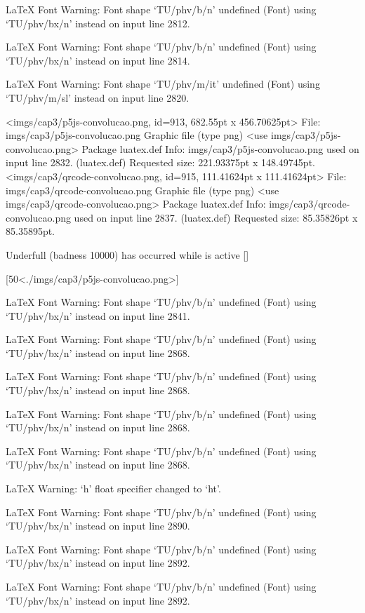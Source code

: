 LaTeX Font Warning: Font shape `TU/phv/b/n' undefined
(Font)              using `TU/phv/bx/n' instead on input line 2812.


LaTeX Font Warning: Font shape `TU/phv/b/n' undefined
(Font)              using `TU/phv/bx/n' instead on input line 2814.


LaTeX Font Warning: Font shape `TU/phv/m/it' undefined
(Font)              using `TU/phv/m/sl' instead on input line 2820.

<imgs/cap3/p5js-convolucao.png, id=913, 682.55pt x 456.70625pt>
File: imgs/cap3/p5js-convolucao.png Graphic file (type png)
<use imgs/cap3/p5js-convolucao.png>
Package luatex.def Info: imgs/cap3/p5js-convolucao.png  used on input line 2832.
(luatex.def)             Requested size: 221.93375pt x 148.49745pt.
<imgs/cap3/qrcode-convolucao.png, id=915, 111.41624pt x 111.41624pt>
File: imgs/cap3/qrcode-convolucao.png Graphic file (type png)
<use imgs/cap3/qrcode-convolucao.png>
Package luatex.def Info: imgs/cap3/qrcode-convolucao.png  used on input line 2837.
(luatex.def)             Requested size: 85.35826pt x 85.35895pt.

Underfull \vbox (badness 10000) has occurred while \output is active []

[50<./imgs/cap3/p5js-convolucao.png>]

LaTeX Font Warning: Font shape `TU/phv/b/n' undefined
(Font)              using `TU/phv/bx/n' instead on input line 2841.


LaTeX Font Warning: Font shape `TU/phv/b/n' undefined
(Font)              using `TU/phv/bx/n' instead on input line 2868.


LaTeX Font Warning: Font shape `TU/phv/b/n' undefined
(Font)              using `TU/phv/bx/n' instead on input line 2868.


LaTeX Font Warning: Font shape `TU/phv/b/n' undefined
(Font)              using `TU/phv/bx/n' instead on input line 2868.


LaTeX Font Warning: Font shape `TU/phv/b/n' undefined
(Font)              using `TU/phv/bx/n' instead on input line 2868.


LaTeX Warning: `h' float specifier changed to `ht'.


LaTeX Font Warning: Font shape `TU/phv/b/n' undefined
(Font)              using `TU/phv/bx/n' instead on input line 2890.


LaTeX Font Warning: Font shape `TU/phv/b/n' undefined
(Font)              using `TU/phv/bx/n' instead on input line 2892.


LaTeX Font Warning: Font shape `TU/phv/b/n' undefined
(Font)              using `TU/phv/bx/n' instead on input line 2892.


